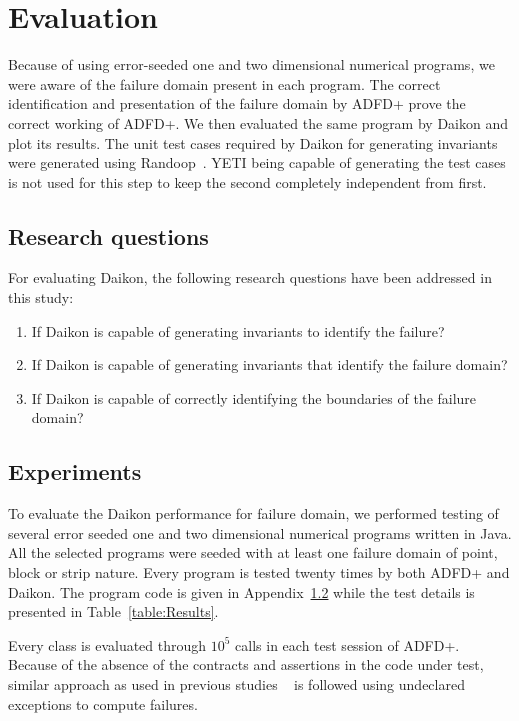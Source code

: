 

\section{Evaluation}\label{sec:eval}
Because of using error-seeded one and two dimensional numerical programs, we were aware of the failure domain present in each program. The correct identification and presentation of the failure domain by ADFD+ prove the correct working of ADFD+. We then evaluated the same program by Daikon and plot its results. The unit test cases required by Daikon for generating invariants were generated using Randoop~\cite{}. YETI being capable of generating the test cases is not used for this step to keep the second completely independent from first. 

\subsection{Research questions}
For evaluating Daikon, the following research questions have been addressed in this study:
\begin{enumerate}
\item If Daikon is capable of generating invariants to identify the failure?
\item If Daikon is capable of generating invariants that identify the failure domain?
\item If Daikon is capable of correctly identifying the boundaries of the failure domain?
\end{enumerate}

\subsection{Experiments}
To evaluate the Daikon performance for failure domain, we performed testing of several error seeded one and two dimensional numerical programs written in Java. All the selected programs were seeded with at least one failure domain of point, block or strip nature. Every program is tested twenty times by both ADFD+ and Daikon. The program code is given in Appendix~\ref{} while the test details is presented in Table~\ref{table:Results}.

Every class is evaluated through $10^5$ calls in each test session of ADFD+.
Because of the absence of the contracts and assertions in the code under test, similar approach as used in previous studies ~\cite{Oriol2012} is followed using undeclared exceptions to compute failures.


